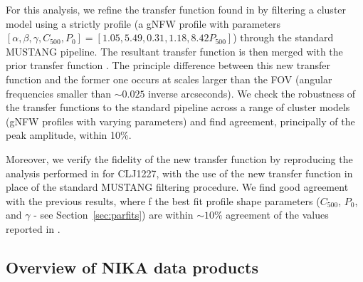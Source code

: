 \documentclass[twocolumn,traditabstract]{aa}
\begin{document}
For this analysis, we refine the transfer function found in  \citet{romero2017} by filtering a cluster model
using a strictly  profile (a gNFW profile with parameters
$[\alpha,\beta,\gamma,C_{500},P_0]=[1.05,5.49,0.31,1.18,8.42 P_{500}]$) through the standard MUSTANG pipeline.
The resultant transfer function is then merged with the prior transfer function \citep[on white noise][]{romero2017}.
The principle difference between this new transfer function and the former one
occurs at scales larger than the FOV (angular frequencies smaller than $\sim0.025$ inverse arcseconds).
We check the robustness of the transfer functions to the standard pipeline across a range of cluster models
(gNFW profiles with varying parameters) and find agreement, principally of the peak amplitude, within 10\%.

Moreover, we verify the fidelity of the new transfer function by reproducing the analysis performed in
\citet{romero2017} for CLJ1227, with the use of the new transfer function in place of the standard MUSTANG
filtering procedure. We find good agreement with the previous results, where
f%
the best fit profile shape parameters ($C_{500}$, $P_0$, and $\gamma$ - see Section~\ref{sec:parfits})
are within $\sim10$\% agreement of the values reported in \citet{romero2017}.

\subsection{Overview of NIKA data products}
\label{sec:nikaobs}
\end{document}
